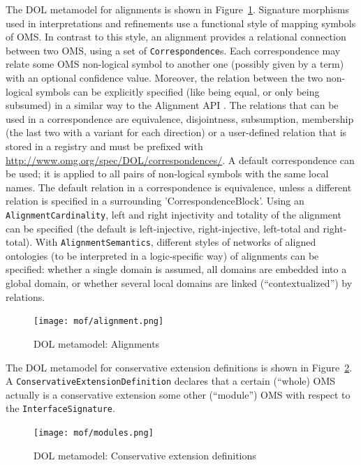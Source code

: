 \documentclass[10pt, a4paper]{isov2}
\newcommand*{\termref}[1]{\index{#1}#1\xspace}
\newcommand*{\syntax}[1]{\texttt{#1}}
\begin{document}
The DOL metamodel for alignments is shown in
Figure~\ref{fig:alignment}.
Signature morphisms used in interpretations and refinements use
a functional style of mapping symbols of OMS.
In contrast to this style, an alignment provides a relational
connection between two OMS,  using a set of \syntax{Correspondence}s. Each correspondence may relate
some OMS non-logical symbol to another one (possibly given by a term) with an optional confidence
value. Moreover, the relation between the two non-logical symbols can be explicitly
specified (like being equal, or only being subsumed) in a similar way to the Alignment API \cite{AlignmentAPI}.
The relations that can be used in a correspondence are equivalence, disjointness, subsumption, membership (the last two with a
variant for each direction) or a user-defined relation that is stored in a registry and must be prefixed with
\url{http://www.omg.org/spec/DOL/correspondences/}.
A default correspondence can be used; it is applied to all pairs of non-logical symbols with
the same local names. The default relation in a correspondence is equivalence, unless  a different
relation is specified in a surrounding
'CorrespondenceBlock'.
Using an \syntax{AlignmentCardinality}, left and right injectivity and totality of the
\termref{alignment} can be specified (the default is left-injective, right-injective, left-total  and right-total).
With \syntax{AlignmentSemantics}, different styles of networks of aligned ontologies (to be interpreted in
a logic-specific way) of alignments can be specified: whether a single domain is assumed, all domains are embedded into a global domain,
or whether several local domains are linked (``contextualized'') by relations.

\begin{figure}
  \centering
\vspace{-2.5cm}
    \texttt{[image: mof/alignment.png]}
  \caption{DOL metamodel: Alignments}
  \label{fig:alignment}
\end{figure}


The DOL metamodel for conservative extension definitions is shown in
Figure~\ref{fig:modules}.
A \syntax{ConservativeExtension\-Definition} declares that a certain (``whole) OMS
actually is a conservative extension some other (``module'') OMS with respect
to the \syntax{InterfaceSignature}.


\begin{figure}
  \centering
    \texttt{[image: mof/modules.png]}
  \caption{DOL metamodel: Conservative extension definitions}
  \label{fig:modules}
\end{figure}
\end{document}
